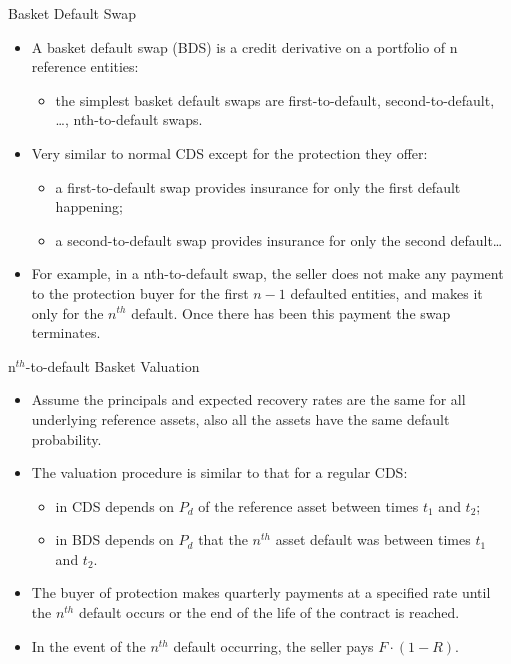 \documentclass{beamer}
\begin{document}
\begin{frame}{Basket Default Swap}
  \begin{itemize}
  \item A basket default swap (BDS) is a credit derivative on a portfolio of n reference entities:
    \begin{itemize}
      \item the simplest basket default swaps are first-to-default, second-to-default, \ldots, nth-to-default swaps. 
    \end{itemize}
  \item Very similar to normal CDS except for the protection they offer:
    \begin{itemize}
      \item a first-to-default swap provides insurance for only the first default happening;
      \item a second-to-default swap provides insurance for only the second default\ldots
    \end{itemize}
  \item For example, in a nth-to-default swap, the seller does not make any payment to the protection buyer for the first $n-1$ defaulted entities, and makes it only for the $n^{th}$ default. Once there has been this payment the swap terminates.
  \end{itemize}
\end{frame}

\begin{frame}{n$^{th}$-to-default Basket Valuation}
  \begin{itemize}
  \item Assume the principals and expected recovery rates are the same for all underlying reference assets, also all the assets have the same default probability.
  \item The valuation procedure is similar to that for a regular CDS:
    \begin{itemize}
    \item in CDS depends on $P_d$ of the reference asset between times $t_1$ and $t_2$;
    \item in BDS depends on $P_d$ that the $n^{th}$ asset default was between times $t_1$ and $t_2$.
    \end{itemize}
  \item The buyer of protection makes quarterly payments at a specified rate until the $n^{th}$ default occurs or the end of the life of the contract is reached. 
  \item In the event of the $n^{th}$ default occurring, the seller pays $F\cdot(1-R)$.
  \end{itemize}
\end{frame}
\end{document}
